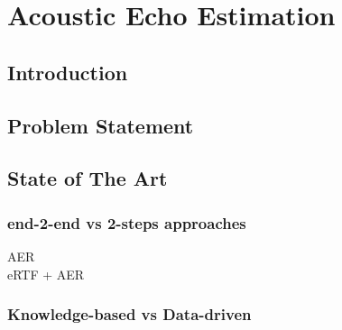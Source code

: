 \chapter{Acoustic Echo Estimation}\label{chap:estimation}

\section{Introduction}
\blindtext[1]


\section{Problem Statement}


\section{State of The Art}

\subsection{end-2-end vs 2-steps approaches}

AER\\
eRTF + AER


\subsection{Knowledge-based vs Data-driven}